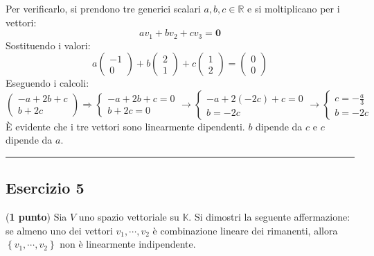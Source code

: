 \documentclass[a4paper]{article}
\newcommand{\longline}{\noindent\rule{\textwidth}{0.4pt}}
\begin{document}
	\noindent
	Per verificarlo, si prendono tre generici scalari $a,b,c \in \mathbb{R}$ e si moltiplicano per i vettori:
	\begin{equation*}
		av_{1} + bv_{2} + cv_{3} = \mathbf{0}
	\end{equation*}
	Sostituendo i valori:
	\begin{equation*}
		a
		\begin{pmatrix}
			-1 \\ 0
		\end{pmatrix}
		+ b
		\begin{pmatrix}
			2 \\ 1
		\end{pmatrix}
		+ c
		\begin{pmatrix}
			1 \\ 2
		\end{pmatrix}
		=
		\begin{pmatrix}
			0 \\ 0
		\end{pmatrix}
	\end{equation*}
	Eseguendo i calcoli:
	\begin{equation*}
		\begin{pmatrix}
			-a + 2b + c \\
			b + 2c
		\end{pmatrix} \Longrightarrow
		\begin{cases}
			-a + 2b + c = 0 \\
			b + 2c = 0
		\end{cases} \longrightarrow
		\begin{cases}
			-a + 2\left(-2c\right) + c = 0 \\
			b = -2c
		\end{cases} \longrightarrow
		\begin{cases}
			c = -\frac{a}{3} \\
			b = -2c
		\end{cases}
	\end{equation*}
	È evidente che i tre vettori sono linearmente dipendenti. $b$ dipende da $c$ e $c$ dipende da $a$.

	\longline

	\subsection{Esercizio 5}

	(\textbf{1 punto}) Sia $V$ uno spazio vettoriale su $\mathbb{K}$. Si dimostri la seguente affermazione: se almeno uno dei vettori $v_{1}, \cdots, v_{2}$ è combinazione lineare dei rimanenti, allora $\left\{v_{1}, \cdots, v_{2}\right\}$ non è linearmente indipendente.\newline
\end{document}
